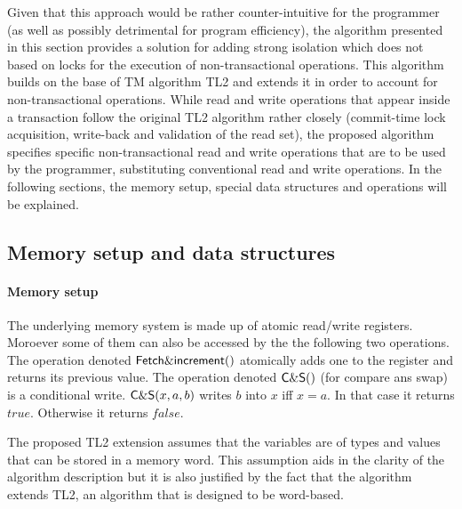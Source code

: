 \documentclass[11pt,letterpaper]{article}
\begin{document}
Given that this approach would be rather counter-intuitive for the 
programmer (as well as possibly detrimental for program efficiency), 
the   algorithm presented  in this  section  provides  a solution  for adding
strong isolation which does not based on locks for the execution 
of non-transactional  operations. This  algorithm builds on  the base  of TM
algorithm  TL2 and  extends it in  order to account for  non-transactional 
operations. While read   and write operations that appear inside a 
transaction follow the original TL2 algorithm rather closely (commit-time lock 
acquisition, write-back and validation of the  read set), 
the proposed algorithm 
specifies specific non-transactional read and  write operations 
that are to be used 
by the programmer, substituting conventional read and write operations. 
In the following sections, the memory setup, special data structures 
and operations will be explained.


\subsection{Memory setup and data structures}


\paragraph{Memory setup}
The underlying memory system is made up of atomic read/write registers. 
Moroever some of them can also be accessed by the the following two 
operations. The operation denoted 
${\sf Fetch\&increment}()$ atomically adds one to the register and 
returns its previous value. 
 The operation denoted 
${\sf C\&S}()$ (for compare ans swap) is a conditional write. 
${\sf C\&S}(x,a,b)$ writes $b$ into $x$ iff $x=a$. In that case it 
returns $\mathit{true}$. Otherwise it returns  $\mathit{false}$. 


The proposed TL2 extension assumes that the
variables  are  of  types and  values  that  can  be   stored in  a  memory
word. This assumption aids in the clarity of the algorithm description  
but it  is also  justified by the  fact that  the algorithm extends  TL2, an
algorithm that is   designed to be word-based. 
\end{document}
